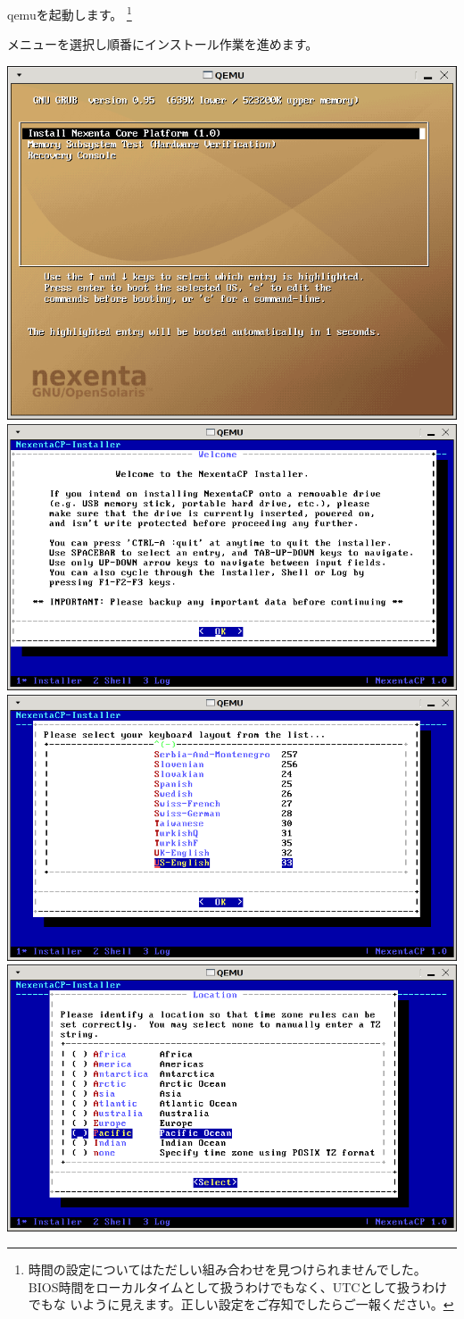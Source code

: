 \documentclass[mingoth,a4paper]{jsarticle}
\begin{document}
qemuを起動します。
\footnote{時間の設定についてはただしい組み合わせを見つけられませんでした。
BIOS時間をローカルタイムとして扱うわけでもなく、UTCとして扱うわけでもな
いように見えます。正しい設定をご存知でしたらご一報ください。}



メニューを選択し順番にインストール作業を進めます。

\includegraphics[width=0.5\hsize]{image200804/nexenta1.png}
\includegraphics[width=0.5\hsize]{image200804/nexenta2.png}
\includegraphics[width=0.5\hsize]{image200804/nexenta3.png}
\includegraphics[width=0.5\hsize]{image200804/nexenta4.png}
\end{document}
